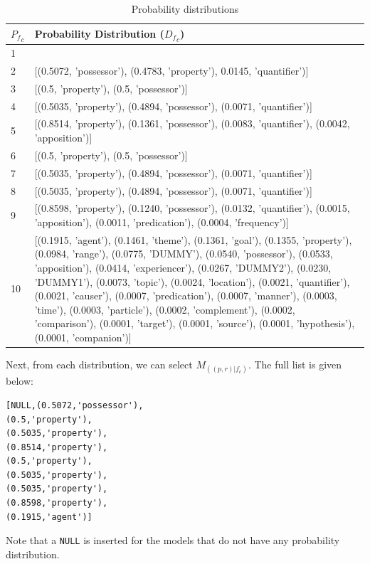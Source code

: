 \documentclass[11pt]{article}
\begin{document}
\begin{table}[!h]
\small
\begin{tabular}{|l|p{6.3cm}|}
\hline \bf ${P_f}_c$ & \bf  Probability Distribution (${D_f}_c$) \\ 
\hline 1 &  \\ 
\hline 2 & [(0.5072, 'possessor'), (0.4783, 'property'), 0.0145, 'quantifier')]\\ 
\hline 3 & [(0.5, 'property'), (0.5, 'possessor')] \\ 
\hline 4 & [(0.5035, 'property'), (0.4894, 'possessor'), (0.0071, 'quantifier')] \\ 
\hline 5 & [(0.8514, 'property'), (0.1361, 'possessor'), (0.0083, 'quantifier'), (0.0042, 'apposition')]\\ 
\hline 6 & [(0.5, 'property'), (0.5, 'possessor')]\\ 
\hline 7 & [(0.5035, 'property'), (0.4894, 'possessor'), (0.0071, 'quantifier')] \\ 
\hline 8 & [(0.5035, 'property'), (0.4894, 'possessor'), (0.0071, 'quantifier')]\\ 
\hline 9 &[(0.8598, 'property'), (0.1240, 'possessor'), (0.0132, 'quantifier'), (0.0015, 'apposition'), (0.0011, 'predication'), (0.0004, 'frequency')]\\ 
\hline 10 & [(0.1915, 'agent'), (0.1461, 'theme'), (0.1361, 'goal'), (0.1355, 'property'), (0.0984, 'range'), (0.0775, 'DUMMY'), (0.0540, 'possessor'), (0.0533, 'apposition'), (0.0414, 'experiencer'), (0.0267, 'DUMMY2'), (0.0230, 'DUMMY1'), (0.0073, 'topic'), (0.0024, 'location'), (0.0021, 'quantifier'), (0.0021, 'causer'), (0.0007, 'predication'), (0.0007, 'manner'), (0.0003, 'time'), (0.0003, 'particle'), (0.0002, 'complement'), (0.0002, 'comparison'), (0.0001, 'target'), (0.0001, 'source'), (0.0001, 'hypothesis'), (0.0001, 'companion')] \\ 
\hline 
\end{tabular}  
\caption{Probability distributions}
\end{table}
\noindent Next, from each distribution, we can select $M_{((p,r)|f_c)}$. The full list is given below:
\begin{verbatim}
[NULL,(0.5072,'possessor'),
(0.5,'property'),
(0.5035,'property'),
(0.8514,'property'),
(0.5,'property'),
(0.5035,'property'),
(0.5035,'property'),
(0.8598,'property'),
(0.1915,'agent')]
\end{verbatim}
Note that a \verb+NULL+ is inserted for the models that do not have any probability distribution.\\
\end{document}
